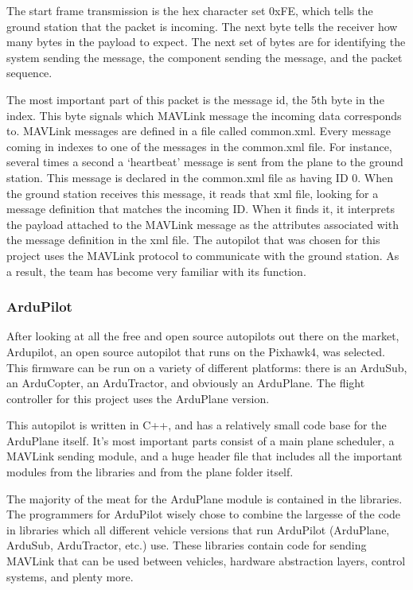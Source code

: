 \documentclass[12pt,journal,compsoc]{IEEEtran}
\begin{document}
The start frame transmission is the hex character set 0xFE, which tells the ground station that the packet is incoming. The next byte tells the receiver how many bytes in the payload to expect. The next set of bytes are for identifying the system sending the message, the component sending the message, and the packet sequence.

The most important part of this packet is the message id, the 5th byte in the index. This byte signals which MAVLink message the incoming data corresponds to. MAVLink messages are defined in a file called common.xml. Every message coming in indexes to one of the messages in the common.xml file. For instance, several times a second a ‘heartbeat' message is sent from the plane to the ground station. This message is declared in the common.xml file as having ID 0. When the ground station receives this message, it reads that xml file, looking for a message definition that matches the incoming ID. When it finds it, it interprets the payload attached to the MAVLink message as the attributes associated with the message definition in the xml file. 
The autopilot that was chosen for this project uses the MAVLink protocol to communicate with the ground station. As a result, the team has become very familiar with its function. 
\subsubsection{ArduPilot}
After looking at all the free and open source autopilots out there on the market, Ardupilot, an open source autopilot that runs on the Pixhawk4, was selected. This firmware can be run on a variety of different platforms: there is an ArduSub, an ArduCopter, an ArduTractor, and obviously an ArduPlane. The flight controller for this project uses the ArduPlane version. 

This autopilot is written in C++, and has a relatively small code base for the ArduPlane itself. It's most important parts consist of a main plane scheduler, a MAVLink sending module, and a huge header file that includes all the important modules from the libraries and from the plane folder itself. 

The majority of the meat for the ArduPlane module is contained in the libraries. The programmers for ArduPilot wisely chose to combine the largesse of the code in libraries which all different vehicle versions that run ArduPilot (ArduPlane, ArduSub, ArduTractor, etc.) use. These libraries contain code for sending MAVLink that can be used between vehicles, hardware abstraction layers, control systems, and plenty more. 
\end{document}
